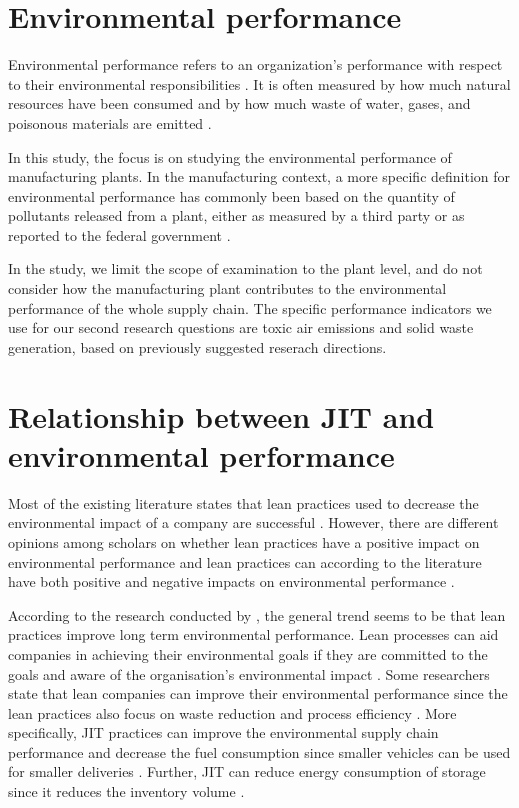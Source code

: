 \section{Environmental performance}
Environmental performance refers to an organization’s performance with respect to their environmental responsibilities \citep{maoLowCarbonSupply2017, mollenkopfGreenLeanGlobal2010}. 
It is often measured by how much natural resources have been consumed and by how much waste of water, gases, and poisonous materials are emitted \citep{maoLowCarbonSupply2017}.
 
In this study, the focus is on studying the environmental performance of manufacturing plants. In the manufacturing context, a more specific definition for environmental performance has commonly been based on the quantity of pollutants released from a plant, either as measured by a third party \citep{bragdonAntecedentsGreenValue2005} or as reported to the federal government \citep{freedmanDeterminantsPollutionPrevention1998, klassenMakingEnvironmentalSustainability2010}.
 
In the study, we limit the scope of examination to the plant level, and do not consider how the manufacturing plant contributes to the environmental performance of the whole supply chain. The specific performance indicators we use for our second research questions are toxic air emissions and solid waste generation, based on previously suggested reserach directions. \citep{diesteRelationshipLeanEnvironmental2019}

\section{Relationship between JIT and environmental performance}
Most of the existing literature states that lean practices used to decrease the environmental impact of a company are successful \citep{diesteEvaluatingImpactLean2020}. 
However, there are different opinions among scholars on whether lean practices have a positive impact on environmental performance and lean practices can according to the literature have both positive and negative impacts on environmental performance \citep{diesteEvaluatingImpactLean2020}.

According to the research conducted by \citep{diesteEvaluatingImpactLean2020}, the general trend seems to be that lean practices improve long term environmental performance. 
Lean processes can aid companies in achieving their environmental goals if they are committed to the goals and aware of the organisation’s environmental impact \citep{diesteEvaluatingImpactLean2020}. 
Some researchers state that lean companies can improve their environmental performance since the lean practices also focus on waste reduction and process efficiency \citep{diesteEvaluatingImpactLean2020}. 
More specifically, JIT practices can improve the environmental supply chain performance \citep{cherrafiLeanGreenPractices2018, diesteEvaluatingImpactLean2020} and decrease the fuel consumption since smaller vehicles can be used for smaller deliveries \citep{garza-reyesLeanGreenTransport2016}. 
Further, JIT can reduce energy consumption of storage since it reduces the inventory volume \citep{garza-reyesEffectLeanMethods2018}.

